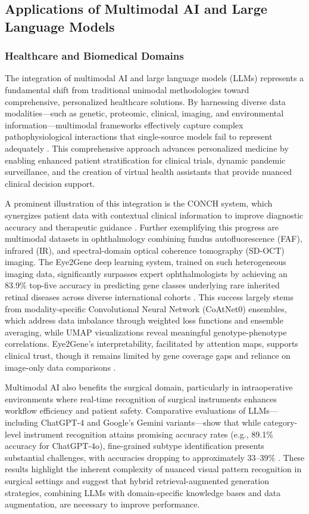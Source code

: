 \documentclass[sigconf]{acmart}
\begin{document}
\subsection{Applications of Multimodal AI and Large Language Models}

\subsubsection{Healthcare and Biomedical Domains}

The integration of multimodal AI and large language models (LLMs) represents a fundamental shift from traditional unimodal methodologies toward comprehensive, personalized healthcare solutions. By harnessing diverse data modalities—such as genetic, proteomic, clinical, imaging, and environmental information—multimodal frameworks effectively capture complex pathophysiological interactions that single-source models fail to represent adequately \cite{ref12}. This comprehensive approach advances personalized medicine by enabling enhanced patient stratification for clinical trials, dynamic pandemic surveillance, and the creation of virtual health assistants that provide nuanced clinical decision support.

A prominent illustration of this integration is the CONCH system, which synergizes patient data with contextual clinical information to improve diagnostic accuracy and therapeutic guidance \cite{ref12}. Further exemplifying this progress are multimodal datasets in ophthalmology combining fundus autofluorescence (FAF), infrared (IR), and spectral-domain optical coherence tomography (SD-OCT) imaging. The Eye2Gene deep learning system, trained on such heterogeneous imaging data, significantly surpasses expert ophthalmologists by achieving an 83.9\% top-five accuracy in predicting gene classes underlying rare inherited retinal diseases across diverse international cohorts \cite{ref10}. This success largely stems from modality-specific Convolutional Neural Network (CoAtNet0) ensembles, which address data imbalance through weighted loss functions and ensemble averaging, while UMAP visualizations reveal meaningful genotype-phenotype correlations. Eye2Gene’s interpretability, facilitated by attention maps, supports clinical trust, though it remains limited by gene coverage gaps and reliance on image-only data comparisons \cite{ref10}.

Multimodal AI also benefits the surgical domain, particularly in intraoperative environments where real-time recognition of surgical instruments enhances workflow efficiency and patient safety. Comparative evaluations of LLMs—including ChatGPT-4 and Google's Gemini variants—show that while category-level instrument recognition attains promising accuracy rates (e.g., 89.1\% accuracy for ChatGPT-4o), fine-grained subtype identification presents substantial challenges, with accuracies dropping to approximately 33–39\% \cite{ref26}. These results highlight the inherent complexity of nuanced visual pattern recognition in surgical settings and suggest that hybrid retrieval-augmented generation strategies, combining LLMs with domain-specific knowledge bases and data augmentation, are necessary to improve performance.
\end{document}
